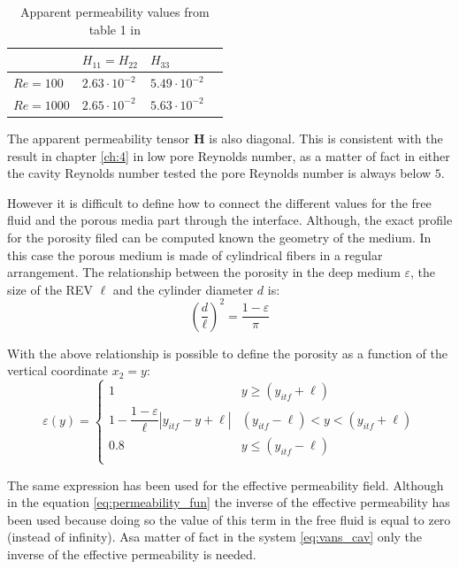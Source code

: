 \begin{table}[h]
	\centering
	\begin{tabular}{ l | l |  l   l   }
		& $H_{11} = H_{22}$ & $H_{33}$ \\ 
		\hline
		\hline
		$Re=100$ & $2.63 \cdot 10^{-2}$ & $5.49 \cdot 10^{-2}$ \\ 
		$Re=1000$ & $2.65 \cdot 10^{-2}$ & $5.63 \cdot 10^{-2}$
	\end{tabular}
	\caption{Apparent permeability values from table 1 in \citet{zampogna2016fluid}}
	\label{tab:H}
\end{table}

The apparent permeability tensor $\mathbf{H}$ is also diagonal. This is consistent with the result in chapter \ref{ch:4} in low pore Reynolds number, as a matter of fact in either the cavity Reynolds number tested the pore Reynolds number is always below $5$.

However it is difficult to define how to connect the different values for the free fluid and the porous media part through the interface.
Although, the exact profile for the porosity filed can be computed known the geometry of the medium. In this case the porous medium is made of cylindrical fibers in a regular arrangement. The relationship between the porosity in the deep medium $\varepsilon$, the size of the REV $\ell$ and the cylinder diameter $d$ is:
$$
\left( \dfrac{d}{\ell} \right)^2 = \dfrac{1 - \varepsilon}{\pi}
$$

With the above relationship is possible to define the porosity as a function of the vertical coordinate $x_2 = y$:
\begin{equation}
\varepsilon(y) = 
\begin{cases}
1 & y\geqslant(y_{itf}+\ell) \\
1 - \dfrac{1-\varepsilon}{\ell}|y_{itf} -y +\ell| &  (y_{itf}-\ell)<y<(y_{itf}+\ell)\\
0.8 &y\leqslant(y_{itf}-\ell) \\
\end{cases}
\label{eq:porsitity_fun}
\end{equation}

The same expression has been used for the effective permeability field. Although in the equation \eqref{eq:permeability_fun} the inverse of the effective permeability has been used because doing so the value of this term in the free fluid is equal to zero (instead of infinity). Asa matter of fact in the system \eqref{eq:vans_cav} only the inverse of the effective permeability is needed.

